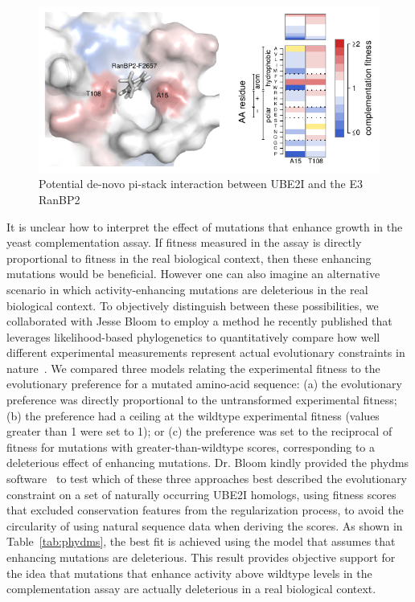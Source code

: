 \begin{figure}[h!]
	\centering
	\includegraphics[width=\textwidth]{img/pi-stack.pdf}
	\caption{Potential de-novo pi-stack interaction between UBE2I and the E3 RanBP2}
	\label{fig:pi-stack}
\end{figure}

It is unclear how to interpret the effect of mutations that enhance growth in the yeast complementation assay. If fitness measured in the assay is directly proportional to fitness in the real biological context, then these enhancing mutations would be beneficial. However one can also imagine an alternative scenario in which activity-enhancing mutations are deleterious in the real biological context. To objectively distinguish between these possibilities, we collaborated with Jesse Bloom to employ a method he recently published that leverages likelihood-based phylogenetics to quantitatively compare how well different experimental measurements represent actual evolutionary constraints in nature~\cite{bloom_experimentally_2014,bloom_identification_2017}. We compared three models relating the experimental fitness to the evolutionary preference for a mutated amino-acid sequence: (a) the evolutionary preference was directly proportional to the untransformed experimental fitness; (b) the preference had a ceiling at the wildtype experimental fitness (values greater than 1 were set to 1); or (c) the preference was set to the reciprocal of fitness for mutations with greater-than-wildtype scores, corresponding to a deleterious effect of enhancing mutations. Dr. Bloom kindly provided the phydms software~\cite{bloom_identification_2017} to test which of these three approaches best described the evolutionary constraint on a set of naturally occurring UBE2I homologs, using fitness scores that excluded conservation features from the regularization process, to avoid the circularity of using natural sequence data when deriving the scores. As shown in Table~\ref{tab:phydms}, the best fit is achieved using the model that assumes that enhancing mutations are deleterious. This result provides objective support for the idea that mutations that enhance activity above wildtype levels in the complementation assay are actually deleterious in a real biological context.

